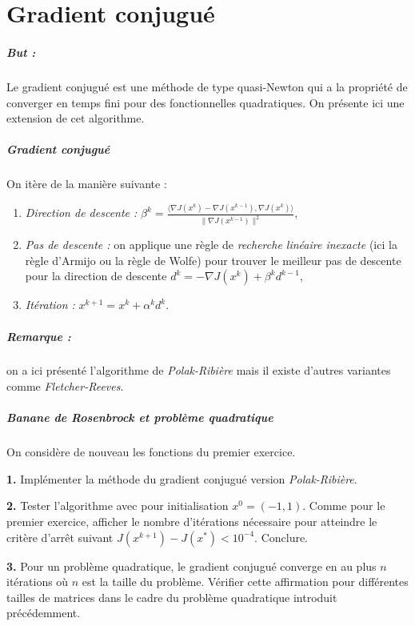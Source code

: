 \documentclass[a4paper,french,12pt]{article}
\begin{document}
\section{Gradient conjugué}
%
\subparagraph{But :} Le gradient conjugué est une méthode de type quasi-Newton qui a la propriété de converger en temps fini pour des fonctionnelles quadratiques. On présente ici une extension de cet algorithme.
\subparagraph{Gradient conjugué}
On itère de la manière suivante :
\begin{enumerate}
\item \textit{Direction de descente :} $\beta^{k} = \frac{\langle \nabla J(x^k) - \nabla J(x^{k-1}), \nabla J(x^k) \rangle}{\| \nabla J(x^{k-1}) \|^2}$,
\item \textit{Pas de descente :} on applique une règle de \textit{recherche linéaire inexacte} (ici la règle d'Armijo ou la règle de Wolfe) pour trouver le meilleur pas de descente pour la direction de descente $d^k = -\nabla J(x^k) + \beta^k d^{k-1}$,
  \item \textit{Itération :} $x^{k+1} = x^k + \alpha^k d^k$.
  \end{enumerate}
  \subparagraph{Remarque :} on a ici présenté l'algorithme de \textit{Polak-Ribière} mais il existe d'autres variantes comme \textit{Fletcher-Reeves}. 

  \subparagraph{Banane de Rosenbrock et problème quadratique} On considère de nouveau les fonctions du premier exercice.

  \textbf{1.} Implémenter la méthode du gradient conjugué version \textit{Polak-Ribière}.
  
  \textbf{2.} Tester l'algorithme avec pour initialisation $x^0 = (-1,1)$. Comme pour le premier exercice, afficher le nombre d'itérations nécessaire pour atteindre le critère
  d'arrêt suivant $J(x^{k+1})-J(x^*) < 10^{-4}$. Conclure.

  \textbf{3.} Pour un problème quadratique, le gradient conjugué converge en au plus $n$ itérations où $n$ est la taille du problème. Vérifier cette affirmation pour différentes tailles de matrices dans le cadre du problème quadratique introduit précédemment.
  
\end{document}
